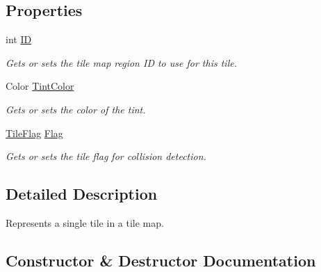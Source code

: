 \subsection*{Properties}
\begin{DoxyCompactItemize}
\item 
int \hyperlink{class_midnight_blue_1_1_tile_a67011be5ab290007a4a45c4b6b0d24f0}{ID}
\begin{DoxyCompactList}\small\item\em Gets or sets the tile map region ID to use for this tile. \end{DoxyCompactList}\item 
Color \hyperlink{class_midnight_blue_1_1_tile_a01da016ec2ef47b50e6bac7e01ae031b}{Tint\+Color}
\begin{DoxyCompactList}\small\item\em Gets or sets the color of the tint. \end{DoxyCompactList}\item 
\hyperlink{namespace_midnight_blue_ad3f455dc6bab1e76768d1a468ae3e33b}{Tile\+Flag} \hyperlink{class_midnight_blue_1_1_tile_a51397c4b6a08c8017a3d5555ed5822c6}{Flag}
\begin{DoxyCompactList}\small\item\em Gets or sets the tile flag for collision detection. \end{DoxyCompactList}\end{DoxyCompactItemize}


\subsection{Detailed Description}
Represents a single tile in a tile map. 



\subsection{Constructor \& Destructor Documentation}
\hypertarget{class_midnight_blue_1_1_tile_a4e0e9f97acbb22eb1d54945b44d52e7b}{}\label{class_midnight_blue_1_1_tile_a4e0e9f97acbb22eb1d54945b44d52e7b} 
